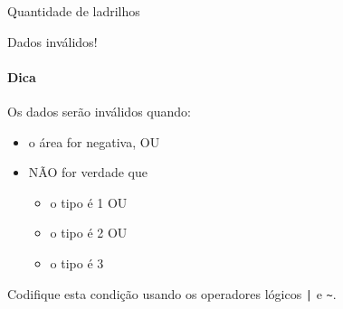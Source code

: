 \documentclass[11pt,fleqn]{practice}
\begin{document}
\begin{task}[breakable]{Quantidade de ladrilhos}{}
\begin{runexample}
Dados inválidos!
  \end{runexample}

  \paragraph{Dica}
  Os dados serão inválidos quando:
  \begin{itemize}
    \item o área for negativa, OU
    \item NÃO for verdade que
    \begin{itemize}
      \item o tipo é 1 OU
      \item o tipo é 2 OU
      \item o tipo é 3
    \end{itemize}
  \end{itemize}
  Codifique esta condição usando os operadores lógicos \verb=|= e
  \verb=~=.

  \tcblower
  \solution
\end{task}
\end{document}
